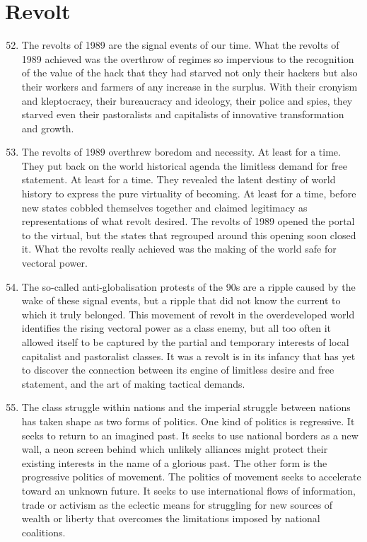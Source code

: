\documentclass[letterpaper,12pt,english]{sphinxmanual}
\begin{document}
\section{Revolt}
\label{wark:revolt}\begin{enumerate}
\setcounter{enumi}{51}
\item {} 
The revolts of 1989 are the signal events of our time. What the revolts of 1989 achieved was the overthrow of regimes so impervious to the recognition of the value of the hack that they had starved not only their hackers but also their workers and farmers of any increase in the surplus. With their cronyism and kleptocracy, their bureaucracy and ideology, their police and spies, they starved even their pastoralists and capitalists of innovative transformation and growth.

\item {} 
The revolts of 1989 overthrew boredom and necessity. At least for a time. They put back on the world historical agenda the limitless demand for free statement. At least for a time. They revealed the latent destiny of world history to express the pure virtuality of becoming. At least for a time, before new states cobbled themselves together and claimed legitimacy as representations of what revolt desired. The revolts of 1989 opened the portal to the virtual, but the states that regrouped around this opening soon closed it. What the revolts really achieved was the making of the world safe for vectoral power.

\item {} 
The so-called anti-globalisation protests of the 90s are a ripple caused by the wake of these signal events, but a ripple that did not know the current to which it truly belonged. This movement of revolt in the overdeveloped world identifies the rising vectoral power as a class enemy, but all too often it allowed itself to be captured by the partial and temporary interests of local capitalist and pastoralist classes. It was a revolt is in its infancy that has yet to discover the connection between its engine of limitless desire and free statement, and the art of making tactical demands.

\item {} 
The class struggle within nations and the imperial struggle between nations has taken shape as two forms of politics. One kind of politics is regressive. It seeks to return to an imagined past. It seeks to use national borders as a new wall, a neon screen behind which unlikely alliances might protect their existing interests in the name of a glorious past. The other form is the progressive politics of movement. The politics of movement seeks to accelerate toward an unknown future. It seeks to use international flows of information, trade or activism as the eclectic means for struggling for new sources of wealth or liberty that overcomes the limitations imposed by national coalitions.


\end{enumerate}
\end{document}
